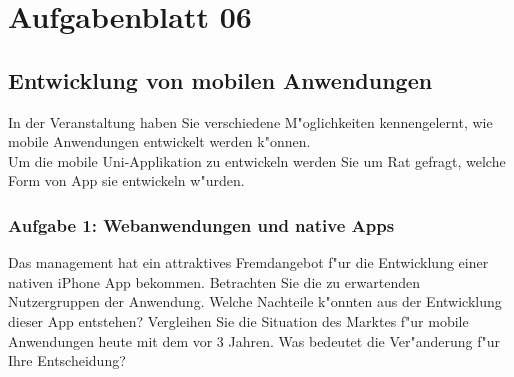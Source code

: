 

\chapter{Aufgabenblatt 06}

\section{Entwicklung von mobilen Anwendungen}
In der Veranstaltung haben Sie verschiedene M"oglichkeiten kennengelernt, wie mobile Anwendungen entwickelt werden k"onnen.\\
Um die mobile Uni-Applikation zu entwickeln werden Sie um Rat gefragt, welche Form von App sie entwickeln w"urden.

\subsection{Aufgabe 1: Webanwendungen und native Apps}
Das management hat ein attraktives Fremdangebot f"ur die Entwicklung einer nativen iPhone App bekommen.
Betrachten Sie die zu erwartenden Nutzergruppen der Anwendung.
Welche Nachteile k"onnten aus der Entwicklung dieser App entstehen?
Vergleihen Sie die Situation des Marktes f"ur mobile Anwendungen heute mit dem vor 3 Jahren.
Was bedeutet die Ver"anderung f"ur Ihre Entscheidung?


